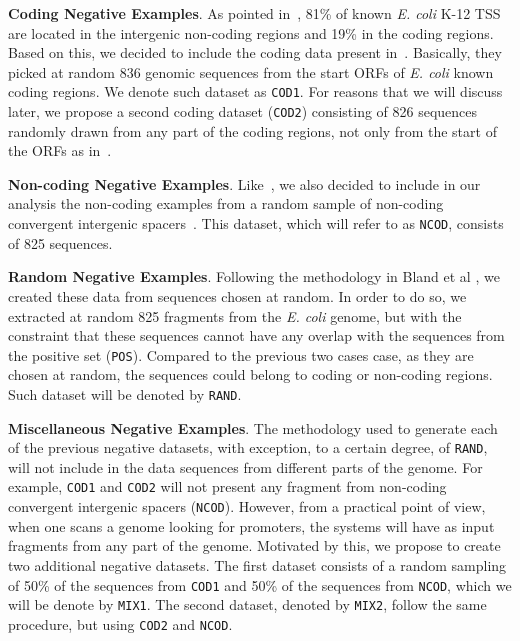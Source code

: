 \documentclass[runningheads,a4paper]{llncs}
\begin{document}
\noindent
{\bf Coding Negative Examples}. As pointed in~\cite{gordon2003}, 81\% of known {\it E. coli} K-12 TSS are located in the intergenic non-coding regions and 19\% in the coding regions. Based on this,  we decided to include the coding data present in~\cite{gordon2003,song2011}. Basically, they picked at random   836 genomic sequences  from the start ORFs of      {\it E. coli}  known coding regions. We denote such dataset as {\tt COD1}. For reasons that we will discuss later,  we propose a second coding dataset ({\tt COD2}) consisting of 826 sequences randomly drawn from any part of the coding regions, not only from  the start of the ORFs as in~\cite{gordon2003,song2011}. 

\noindent
{\bf Non-coding Negative Examples}. Like~\cite{gordon2003,song2011}, we also decided to include in our analysis the non-coding examples from a random sample of non-coding convergent intergenic spacers~\cite{palleja2009}. This dataset, which will refer to as {\tt NCOD}, consists of 825 sequences. 

\noindent
{\bf Random Negative Examples}. Following the methodology in Bland et al \cite{bland2010}, we created these data  from sequences chosen at random. In order to do so,  we extracted  at random   825  fragments from the {\it E. coli}  genome, but with the constraint that these sequences cannot have any overlap with the sequences from the positive set ({\tt POS}).  Compared to the previous two cases case, as they are chosen at random, the sequences  could belong to coding or non-coding regions. Such  dataset will be denoted by {\tt RAND}.

\noindent
{\bf Miscellaneous Negative Examples}. The methodology used to generate each of  the previous negative datasets, with exception, to a certain degree,  of {\tt RAND}, will not include in the data sequences from different parts of the genome. For example, {\tt COD1} and {\tt COD2} will not present any fragment from  non-coding convergent intergenic spacers ({\tt NCOD}). However, from a practical point of view, when one scans a genome looking for promoters, the systems will have as input fragments from any part of the genome. Motivated by this,  we propose to create two additional negative datasets. The first dataset consists of a random sampling of 50\% of the sequences from {\tt COD1} and  50\% of the sequences from  {\tt NCOD}, which we  will be denote by  {\tt MIX1}. The second dataset, denoted by {\tt MIX2},  follow the same procedure, but using  {\tt COD2} and {\tt NCOD}. 
\end{document}

